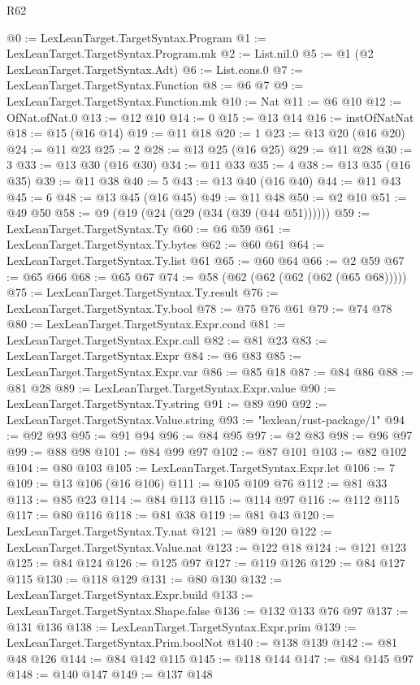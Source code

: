 \begin{lexlean}{R62}
\begin{coremodule}
@0 := LexLeanTarget.TargetSyntax.Program
@1 := LexLeanTarget.TargetSyntax.Program.mk
@2 := List.nil.{0}
@5 := @1 (@2 LexLeanTarget.TargetSyntax.Adt)
@6 := List.cons.{0}
@7 := LexLeanTarget.TargetSyntax.Function
@8 := @6 @7
@9 := LexLeanTarget.TargetSyntax.Function.mk
@10 := Nat
@11 := @6 @10
@12 := OfNat.ofNat.{0}
@13 := @12 @10
@14 := 0
@15 := @13 @14
@16 := instOfNatNat
@18 := @15 (@16 @14)
@19 := @11 @18
@20 := 1
@23 := @13 @20 (@16 @20)
@24 := @11 @23
@25 := 2
@28 := @13 @25 (@16 @25)
@29 := @11 @28
@30 := 3
@33 := @13 @30 (@16 @30)
@34 := @11 @33
@35 := 4
@38 := @13 @35 (@16 @35)
@39 := @11 @38
@40 := 5
@43 := @13 @40 (@16 @40)
@44 := @11 @43
@45 := 6
@48 := @13 @45 (@16 @45)
@49 := @11 @48
@50 := @2 @10
@51 := @49 @50
@58 := @9 (@19 (@24 (@29 (@34 (@39 (@44 @51))))))
@59 := LexLeanTarget.TargetSyntax.Ty
@60 := @6 @59
@61 := LexLeanTarget.TargetSyntax.Ty.bytes
@62 := @60 @61
@64 := LexLeanTarget.TargetSyntax.Ty.list @61
@65 := @60 @64
@66 := @2 @59
@67 := @65 @66
@68 := @65 @67
@74 := @58 (@62 (@62 (@62 (@62 (@65 @68)))))
@75 := LexLeanTarget.TargetSyntax.Ty.result
@76 := LexLeanTarget.TargetSyntax.Ty.bool
@78 := @75 @76 @61
@79 := @74 @78
@80 := LexLeanTarget.TargetSyntax.Expr.cond
@81 := LexLeanTarget.TargetSyntax.Expr.call
@82 := @81 @23
@83 := LexLeanTarget.TargetSyntax.Expr
@84 := @6 @83
@85 := LexLeanTarget.TargetSyntax.Expr.var
@86 := @85 @18
@87 := @84 @86
@88 := @81 @28
@89 := LexLeanTarget.TargetSyntax.Expr.value
@90 := LexLeanTarget.TargetSyntax.Ty.string
@91 := @89 @90
@92 := LexLeanTarget.TargetSyntax.Value.string
@93 := "lexlean/rust-package/1"
@94 := @92 @93
@95 := @91 @94
@96 := @84 @95
@97 := @2 @83
@98 := @96 @97
@99 := @88 @98
@101 := @84 @99 @97
@102 := @87 @101
@103 := @82 @102
@104 := @80 @103
@105 := LexLeanTarget.TargetSyntax.Expr.let
@106 := 7
@109 := @13 @106 (@16 @106)
@111 := @105 @109 @76
@112 := @81 @33
@113 := @85 @23
@114 := @84 @113
@115 := @114 @97
@116 := @112 @115
@117 := @80 @116
@118 := @81 @38
@119 := @81 @43
@120 := LexLeanTarget.TargetSyntax.Ty.nat
@121 := @89 @120
@122 := LexLeanTarget.TargetSyntax.Value.nat
@123 := @122 @18
@124 := @121 @123
@125 := @84 @124
@126 := @125 @97
@127 := @119 @126
@129 := @84 @127 @115
@130 := @118 @129
@131 := @80 @130
@132 := LexLeanTarget.TargetSyntax.Expr.build
@133 := LexLeanTarget.TargetSyntax.Shape.false
@136 := @132 @133 @76 @97
@137 := @131 @136
@138 := LexLeanTarget.TargetSyntax.Expr.prim
@139 := LexLeanTarget.TargetSyntax.Prim.boolNot
@140 := @138 @139
@142 := @81 @48 @126
@144 := @84 @142 @115
@145 := @118 @144
@147 := @84 @145 @97
@148 := @140 @147
@149 := @137 @148

\end{coremodule}
\end{lexlean}
